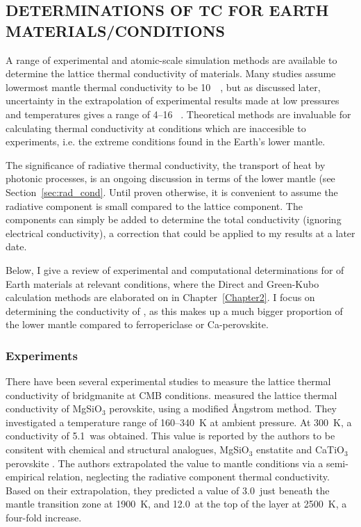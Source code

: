 \subsection{\label{sec:kappa_range}DETERMINATIONS OF TC FOR EARTH MATERIALS/CONDITIONS}

A range of experimental and atomic-scale simulation methods are available to determine the lattice thermal conductivity of materials. Many studies assume lowermost mantle thermal conductivity to be 10~\wmk\ \citep[e.g.][]{Lay2008}, but as discussed later, uncertainty in the extrapolation of experimental results made at low pressures and temperatures gives a range of 4--16 \wmk~\citep{Brown1986a, Osako1991, Hofmeister1999, Goncharov2009, Manthilake2011}. Theoretical methods are invaluable for calculating thermal conductivity at conditions which are inaccesible to experiments, i.e. the extreme conditions found in the Earth's lower mantle. 

The significance of radiative thermal conductivity, the transport of heat by photonic processes, is an ongoing discussion in terms of the lower mantle (see Section~\ref{sec:rad_cond}. Until proven otherwise, it is convenient to assume the radiative component is small compared to the lattice component. The components can simply be added to determine the total conductivity (ignoring electrical conductivity), a correction that could be applied to my results at a later date.

Below, I give a review of experimental and computational determinations for \tcs of Earth materials at relevant conditions, where the Direct and Green-Kubo calculation methods are elaborated on in Chapter~\ref{Chapter2}. I focus on determining the conductivity of \bdg, as this makes up a much bigger proportion of the lower mantle compared to ferropericlase or Ca-perovskite.

\subsubsection{Experiments}

There have been several experimental studies to measure the lattice thermal conductivity of bridgmanite at CMB conditions. \citet{Osako1991} measured the lattice thermal conductivity of MgSiO$_3$ perovskite, using a modified \AA ngstrom method. They investigated a temperature range of 160--340~K at ambient pressure. At 300~K, a conductivity of 5.1~\wmks was obtained. This value is reported by the authors to be consitent with chemical and structural analogues, MgSiO$_3$ enstatite \citep[5.0~\wmk,][]{Horai1971} and CaTiO$_{3}$ perovskite \citep[4~\wmk,][]{Touloukian1970}. The authors extrapolated the value to mantle conditions via a semi-empirical relation, neglecting the radiative component thermal conductivity. Based on their extrapolation, they predicted a value of 3.0~\wmks just beneath the mantle transition zone at 1900~K, and 12.0~\wmks at the top of the \ddds layer at 2500~K, a four-fold increase. 

